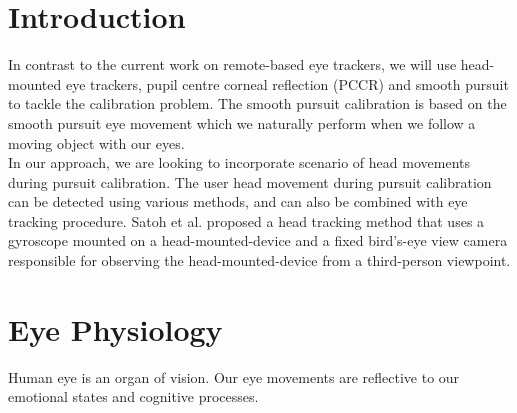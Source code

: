 




\lstset{language=Java, basicstyle=\footnotesize}

\renewcommand{\thepage}{\roman{page}}
\newcommand{\monthword}[1]{\ifcase#1\or January\or February\or March\or April\or
                                        May\or June\or July\or August\or
                                        September\or October\or November\or December\fi} 





\clearpage

\begingroup
  \pagestyle{plain}

\setcounter{tocdepth}{3}
  \tableofcontents
  \clearpage
\endgroup 

\pagestyle{fancy}
\setcounter{page}{1}
\renewcommand{\thepage}{\arabic{page}}




\section{Introduction}

In contrast to the current work on remote-based eye trackers, we will use head-mounted eye trackers, pupil centre corneal reflection (PCCR) and smooth pursuit to tackle the calibration problem. The smooth pursuit calibration is based on the smooth pursuit eye movement which we naturally perform when we follow a moving object with our eyes.\\

In our approach, we are looking to incorporate scenario of head movements during pursuit calibration. The user head movement during pursuit calibration can be detected using various methods, and can also be combined with eye tracking procedure. Satoh et al. \cite{7} proposed a head tracking method that uses a gyroscope mounted on a head-mounted-device and a fixed bird's-eye view camera responsible for observing the head-mounted-device from a third-person viewpoint.

\section{Eye Physiology}

Human eye is an organ of vision. Our eye movements are reflective to our emotional states and cognitive processes.

